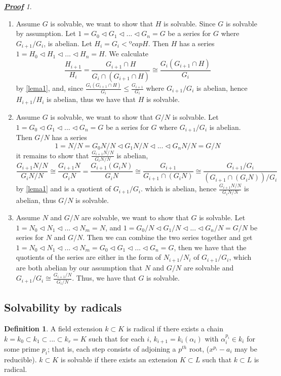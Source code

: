 \documentclass[a4paper, 10pt]{article}
\theoremstyle{plain}
\theoremstyle{definition}
\newtheorem{definicion}[teorema]{Definition}
\theoremstyle{remark}
\newtheorem*{prueba}{\textbf{\textit{\underline{Proof}}}}
\begin{document}
    \begin{prueba}
        \begin{enumerate}
            \item Assume $G$ is solvable, we want to show that $H$ is solvable. Since $G$ is solvable by assumption. Let $1=G_0\vartriangleleft G_1\vartriangleleft ... \vartriangleleft G_n= G$ be a series for $G$ where $G_{i+1}/G_i$, is abelian. Let $H_i=G_i<ºcap H$. Then $H$ has a series $1=H_0\vartriangleleft H_1\vartriangleleft ...\vartriangleleft H_n= H$. We calculate
            \[\frac{H_{i+1}}{H_i}=\frac{G_{i+1}\cap H}{G_i\cap (G_{i+1}\cap H)} \cong \frac{G_i(G_{i+1}\cap H)}{G_i}\]
            by \ref{lema1}, and, since $\frac{G_i(G_{i+1}\cap H)}{G_i}\leqslant \frac{G_{i+1}}{G_i}$ where $G_{i+1}/G_i$ is abelian, hence $H_{i+1}/H_i$ is abelian, thus we have that $H$ is solvable.
            \item Assume $G$ is solvable, we want to show that $G/N$ is solvable. Let $1=G_0\vartriangleleft G_1\vartriangleleft ... \vartriangleleft G_n= G$ be a series for $G$ where $G_{i+1}/G_i$ is abelian. Then $G/N$ has a series
            \[1=N/N=G_0N/N\vartriangleleft G_1N/N\vartriangleleft ... \vartriangleleft G_nN/N=G/N\]
            it remains to show that $\frac{G_{i+1}N/N}{G_iN/N}$ is abelian,
            \[\frac{G_{i+1}N/N}{G_iN/N}\cong \frac{G_{i+1}N}{G_iN}=\frac{G_{i+1}(G_iN)}{G_iN}\cong \frac{G_{i+1}}{G_{i+1}\cap (G_iN)}\cong \frac{G_{i+1}/G_i}{(G_{i+1}\cap (G_iN))/G_i}\]
            by \ref{lema1} and is a quotient of $G_{i+1}/G_i$. which is abelian, hence $\frac{G_{i+1}N/N}{G_iN/N}$ is abelian, thus $G/N$ is solvable.
            \item Assume $N$ and $G/N$ are solvable, we want to show that $G$ is solvable. Let $1=N_0\vartriangleleft N_1\vartriangleleft ... \vartriangleleft N_m =N$, and $1=G_0/N\vartriangleleft G_1/N\vartriangleleft ... \vartriangleleft G_n/N=G/N$ be series for $N$ and $G/N$. Then we can combine the two series together and get $1=N_0\vartriangleleft N_1\vartriangleleft ... \vartriangleleft N_m = G_0\vartriangleleft G_1\vartriangleleft ...\vartriangleleft G_n =G$, then we have that the quotients of the series are either in the form of $N_{i+1}/N_i$ of $G_{i+1}/G_i$, which are both abelian by our assumption that $N$ and $G/N$ are solvable and $G_{i+1}/G_i\cong \frac{G_{i+1}/N}{G_i/N}$. Thus, we have that $G$ is solvable.
        \end{enumerate}
    \end{prueba}

    \subsection{Solvability by radicals}
    \begin{definicion}
        A field extension $k\subset K$ is radical if there exists a chain $k=k_0\subset k_1 \subset ... \subset k_r=K$ such that for each $i$, $k_{i+1}=k_i(\alpha_i)$ with $\alpha_i^{p_i}\in k_i$ for some prime $p_i$; that is, each step consists of adjoining a $p^{th}$ root, ($x^{p_i}-a_i$ may be reducible). $k\subset K$ is solvable if there exists an extension $K\subset L$ such that $k\subset L$ is radical.
    \end{definicion}
\end{document}
